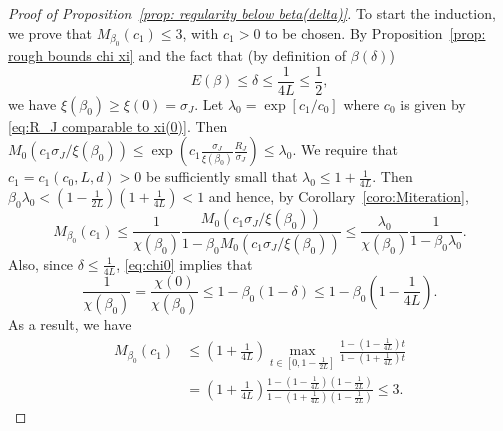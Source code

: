 \documentclass[10pt,a4paper]{amsart}
\begin{document}
\begin{proof}[Proof of Proposition~\textup{\ref{prop: regularity below beta(delta)}}]
To start the induction, we prove that $M_{\beta_0}(c_1) \le 3$,
with $c_1>0$ to be chosen.
By Proposition~\ref{prop: rough bounds chi xi} and the fact that
(by definition of $\beta(\delta)$)
\begin{equation}
\label{eq:Edelta}
    E(\beta)\leq \delta\leq \frac{1}{4L}\leq \frac{1}{2},
\end{equation}
we have $\xi(\beta_0)\geq \xi(0)=\sigma_J$.
Let $\lambda_0 =\exp[c_1/c_0]$ where $c_0$ is given by \eqref{eq:R_J comparable to xi(0)}.
Then $M_0(c_1\sigma_J/\xi(\beta_0))\leq \exp(c_1\tfrac{\sigma_J}{\xi(\beta_0)}\tfrac{R_J}{\sigma_J})\leq \lambda_0$.
We require that $c_1=c_1(c_0,L,d)>0$ be sufficiently small that
$\lambda_0 \leq 1+\tfrac{1}{4L}$.
Then $\beta_0\lambda_0< (1-\tfrac{1}{2L})(1+\tfrac{1}{4L}) < 1$
and hence, by Corollary~\ref{coro:Miteration},
\begin{equation}
	M_{\beta_0}(c_1)\leq \frac{1}{\chi(\beta_0)}\frac{M_0(c_1\sigma_J/\xi(\beta_0))}{1-\beta_0M_0(c_1\sigma_J/\xi(\beta_0))}
\leq \frac{\lambda_0}{\chi(\beta_0)}\frac{1}{1-\beta_0 \lambda_0}.
\end{equation}
Also, since $\delta\leq \frac{1}{4L}$, \eqref{eq:chi0} implies that
\begin{equation}
	\frac{1}{\chi(\beta_0)}
    =
    \frac{\chi(0)}{\chi(\beta_0)}\leq 1-\beta_0(1-\delta)
    \leq 1-\beta_0\left(1-\frac{1}{4L}\right).
\end{equation}
As a result, we have
\begin{align}
\label{eq:proof reg1}
    M_{\beta_0}(c_1) & \le
    \left(1+\frac{1}{4L}\right)\max_{t\in [0,1-\tfrac{1}{2L}]}
    \frac{1-(1-\tfrac{1}{4L})t}{1-(1+\tfrac{1}{4L})t}
    \nonumber \\
    & =
    \left(1+\frac{1}{4L}\right)
    \frac{1-(1-\tfrac{1}{4L})(1-\tfrac{1}{2L})}{1-(1+\tfrac{1}{4L})(1-\tfrac{1}{2L})}\leq 3.
\end{align}



\end{proof}
\end{document}
